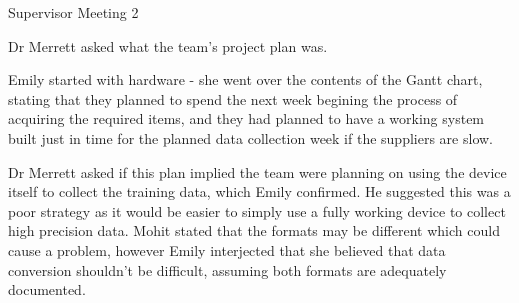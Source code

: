 \documentclass{article}
\begin{document}
\begin{Minutes}{Supervisor Meeting 2}

Dr Merrett asked what the team's project plan was.

Emily started with hardware - she went over the contents of the Gantt chart, stating that they
planned to spend the next week begining the process of acquiring the required items, and they
had planned to have a working system built just in time for the planned data collection week
if the suppliers are slow.

Dr Merrett asked if this plan implied the team were planning on using the
device itself to collect the training data, which Emily confirmed. He suggested this was a
poor strategy as it would be easier to simply use a fully working device to collect high
precision data. Mohit stated that the formats may be different which could cause a problem,
however Emily interjected that she believed that data conversion shouldn't be difficult,
assuming both formats are adequately documented.




\end{Minutes}
\end{document}
